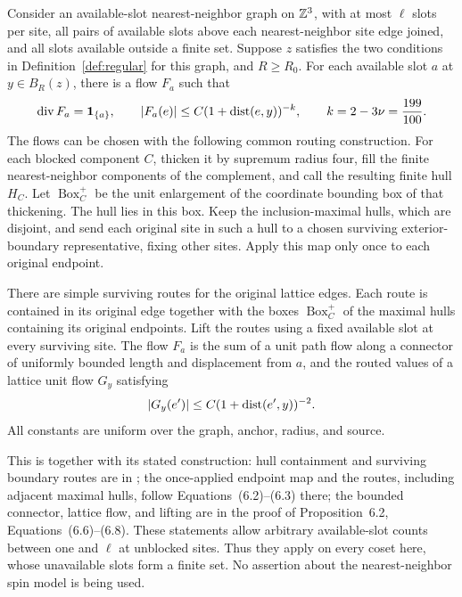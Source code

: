 \begin{lemma}\label{lem:routed-flow}
Consider an available-slot nearest-neighbor graph on \(\mathbb Z^3\), with
at most \(\ell\) slots per site, all pairs of available slots above
each nearest-neighbor site edge joined, and all slots available outside
a finite set.  Suppose \(z\) satisfies the two conditions in
Definition~\ref{def:regular} for this graph, and \(R\ge R_0\).
For each available slot \(a\) at \(y\in B_R(z)\), there is a flow
\(F_a\) such that
\begin{equation}\label{eq:global-flow-envelope}
 \operatorname{div} F_a=\mathbf1_{\{a\}},\qquad
 |F_a(e)|\le C(1+\operatorname{dist}(e,y))^{-k},\qquad
 k=2-3\nu=\frac{199}{100}.
\end{equation}
The flows can be chosen with the following common routing construction.
For each blocked component \(C\), thicken it by supremum radius four,
fill the finite nearest-neighbor components of the complement, and call
the resulting finite hull \(H_C\).  Let \(\operatorname{Box}_C^+\)
be the unit enlargement of the coordinate bounding box of that
thickening.  The hull lies in this box.  Keep the inclusion-maximal
hulls, which are disjoint, and send each original site in such a hull
to a chosen surviving exterior-boundary representative, fixing other
sites.  Apply this map only once to each original endpoint.

There are simple surviving routes for the original lattice edges.
Each route is contained in its original edge together with the boxes
\(\operatorname{Box}_C^+\) of the maximal hulls containing its original
endpoints.  Lift the routes using a fixed available slot at every
surviving site.  The flow \(F_a\) is the sum of a unit path flow along a connector
of uniformly bounded length and displacement from \(a\), and the
routed values of a lattice
unit flow \(G_y\) satisfying
\begin{equation}\label{eq:lattice-flow-envelope}
 |G_y(e')|\le C(1+\operatorname{dist}(e',y))^{-2}.
\end{equation}
All constants are uniform over the graph, anchor, radius, and source.
\end{lemma}

This is \cite[Proposition~6.2]{Ordering} together with its stated
construction: hull containment and surviving boundary routes are in
\cite[Lemma~6.1 and Section~6.1]{Ordering}; the once-applied endpoint
map and the routes, including adjacent maximal hulls, follow
Equations~(6.2)--(6.3) there; the bounded connector, lattice flow, and
lifting are in the proof of Proposition~6.2, Equations~(6.6)--(6.8).
These statements allow arbitrary available-slot counts between one and
\(\ell\) at unblocked sites.  Thus they apply on every coset here,
whose unavailable slots form a finite set.  No assertion about the
nearest-neighbor spin model is being used.

